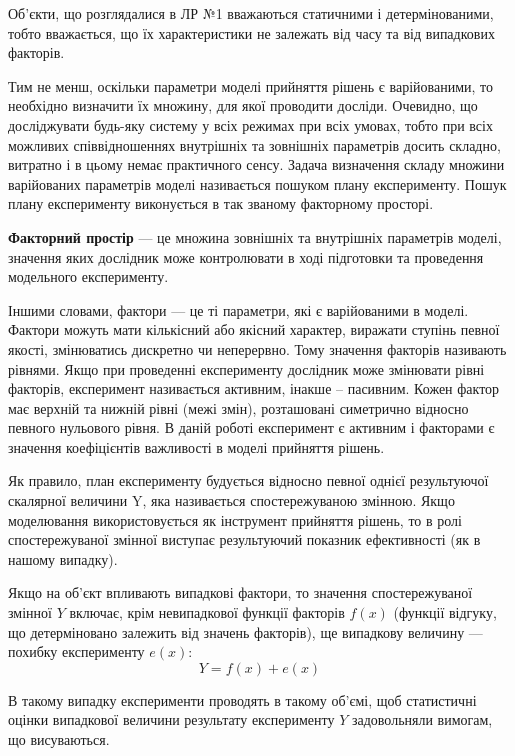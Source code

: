 Об’єкти, що розглядалися в ЛР №1 вважаються статичними і детермінованими, тобто вважається, що їх
характеристики не залежать від часу та від випадкових факторів.

Тим не менш, оскільки параметри моделі прийняття рішень є варійованими, то необхідно визначити їх
множину, для якої проводити досліди. Очевидно, що досліджувати будь-яку систему у всіх режимах при
всіх умовах, тобто при всіх можливих співвідношеннях внутрішніх та зовнішніх параметрів досить
складно, витратно і в цьому немає практичного сенсу. Задача визначення складу множини варійованих
параметрів моделі називається пошуком плану експерименту.  Пошук плану експерименту виконується в
так званому факторному просторі.

\textbf{Факторний простір} --- це множина зовнішніх та внутрішніх параметрів моделі, значення яких
дослідник може контролювати в ході підготовки та проведення модельного експерименту.

Іншими словами, фактори --- це ті параметри, які є варійованими в моделі.  Фактори можуть мати
кількісний або якісний характер, виражати ступінь певної якості, змінюватись дискретно чи
неперервно. Тому значення факторів називають рівнями. Якщо при проведенні експерименту дослідник
може змінювати рівні факторів, експеримент називається активним, інакше – пасивним. Кожен фактор має
верхній та нижній рівні (межі змін), розташовані симетрично відносно певного нульового рівня. В
даній роботі експеримент є активним і факторами є значення коефіцієнтів важливості в моделі
прийняття рішень.

Як правило, план експерименту будується відносно певної однієї результуючої скалярної величини Y,
яка називається спостережуваною змінною. Якщо моделювання використовується як інструмент прийняття
рішень, то в ролі спостережуваної змінної виступає результуючий показник ефективності (як в нашому
випадку).

Якщо на об’єкт впливають випадкові фактори, то значення спостережуваної змінної $Y$ включає, крім
невипадкової функції факторів $f(x)$ (функції відгуку, що детерміновано залежить від значень
факторів), ще випадкову величину --- похибку експерименту $e(x)$:
\begin{equation}
  \label{eq:experimental_error}
  Y = f(x) + e(x)
\end{equation}

В такому випадку експерименти проводять в такому об’ємі, щоб статистичні оцінки випадкової величини
результату експерименту $Y$ задовольняли вимогам, що висуваються.

